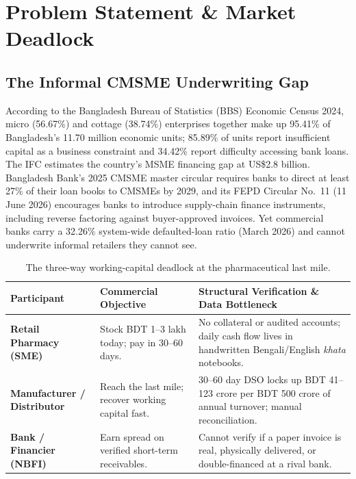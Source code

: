 \documentclass[10pt,a4paper]{article}
\begin{document}
\section{Problem Statement \& Market Deadlock}

\subsection{The Informal CMSME Underwriting Gap}
According to the Bangladesh Bureau of Statistics (BBS) Economic Census 2024, micro (56.67\%) and cottage (38.74\%) enterprises together make up 95.41\% of Bangladesh's 11.70 million economic units; 85.89\% of units report insufficient capital as a business constraint and 34.42\% report difficulty accessing bank loans. The IFC estimates the country's MSME financing gap at US\$2.8 billion. Bangladesh Bank's 2025 CMSME master circular requires banks to direct at least 27\% of their loan books to CMSMEs by 2029, and its FEPD Circular No.~11 (11 June 2026) encourages banks to introduce supply-chain finance instruments, including reverse factoring against buyer-approved invoices. Yet commercial banks carry a 32.26\% system-wide defaulted-loan ratio (March 2026) and cannot underwrite informal retailers they cannot see.

\begin{table}[h!]
\centering
\small
\begin{tabularx}{\textwidth}{L{3.2cm} L{4.2cm} Y}
\toprule
\textbf{Participant} & \textbf{Commercial Objective} & \textbf{Structural Verification \& Data Bottleneck} \\
\midrule
\textbf{Retail Pharmacy (SME)} & Stock BDT 1--3 lakh today; pay in 30--60 days. & No collateral or audited accounts; daily cash flow lives in handwritten Bengali/English \textit{khata} notebooks. \\
\addlinespace
\textbf{Manufacturer / Distributor} & Reach the last mile; recover working capital fast. & 30--60 day DSO locks up BDT 41--123 crore per BDT 500 crore of annual turnover; manual reconciliation. \\
\addlinespace
\textbf{Bank / Financier (NBFI)} & Earn spread on verified short-term receivables. & Cannot verify if a paper invoice is real, physically delivered, or double-financed at a rival bank. \\
\bottomrule
\end{tabularx}
\caption{The three-way working-capital deadlock at the pharmaceutical last mile.}
\end{table}
\end{document}
